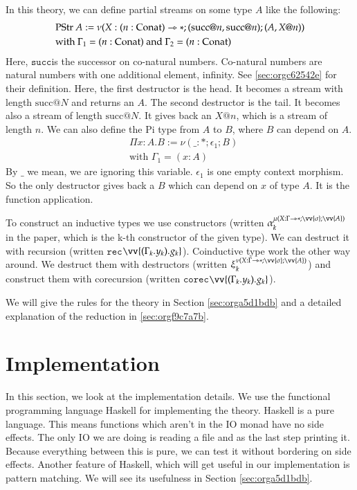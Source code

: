 \documentclass[a4paper,cleardoubleempty,BCOR1cm]{scrbook}
\begin{document}
In this theory, we can define partial streams on some type \(A\) like the following:
\begin{align*}
&\text{PStr }A := \nu(X:(n:\text{Conat})\rightarrowtriangle*;(\text{succ} @ n, \text{succ} @ n);(A, X @ n))\\
&\text{with } \Gamma_1 = (n:\text{Conat}) \text{ and } \Gamma_2 = (n:\text{Conat})
\end{align*}
Here, $\mathtt{succ}$\;is the successor on co-natural numbers.  Co-natural numbers are
natural numbers with one additional element, infinity. See \ref{sec:orgc62542e}
for their definition. Here, the first destructor is the head. It becomes a
stream with length \(\text{succ} @ N\) and returns an \(A\). The second destructor
is the tail. It becomes also a stream of length \(\text{succ} @ N\). It gives
back an \(X @ n\), which is a stream of length \(n\). We can also define the Pi
type from \(A\) to \(B\), where \(B\) can depend on \(A\).
\begin{align*}
&\Pi x:A.B := \nu(\_:*;\epsilon_1;B)\\
&\text{with } \Gamma_1 = (x:A)
\end{align*}
By \(\_\) we mean, we are ignoring this variable. \(\epsilon_1\) is one empty
context morphism.  So the only destructor gives back a \(B\) which can depend
on \(x\) of type \(A\).  It is the function application.

To construct an inductive types we use constructors (written
\(\alpha_k^{\mu(X:\Gamma\rat*;\vv{\sigma};\vv{A})}\) in the paper, which is the k-th
constructor of the given type).  We can destruct it with recursion (written
$\mathtt{rec}$\;\(\vv{(\Gamma_k.y_k).g_k}\)).  Coinductive type work the other way around.
We destruct them with destructors (written
\(\xi_k^{\nu(X:\Gamma\rat*;\vv{\sigma};\vv{A})}\)) and construct them with
corecursion (written $\mathtt{corec}$\;\(\vv{(\Gamma_k.y_k).g_k}\)).

We will give the rules for the theory in Section \ref{sec:orga5d1bdb} and a detailed
explanation of the reduction in \ref{sec:orgf9c7a7b}.

\chapter{Implementation}
\label{sec:org8542692}
In this section, we look at the implementation details.  We use the functional
programming language Haskell for implementing the theory. Haskell is a pure
language. This means functions which aren't in the IO monad have no side
effects. The only IO we are doing is reading a file and as the last step
printing it. Because everything between this is pure, we can test it without
bordering on side effects. Another feature of Haskell, which will get
useful in our implementation is pattern matching. We will see its usefulness
in Section \ref{sec:orga5d1bdb}.
\end{document}
